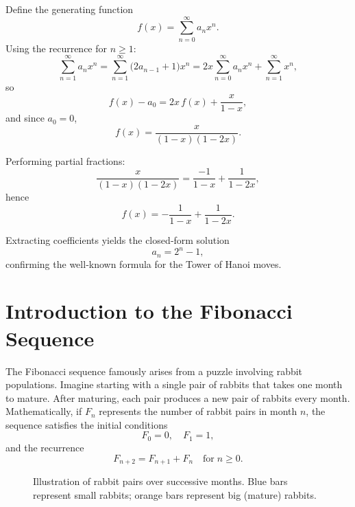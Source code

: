 \documentclass[docmute]{article}
\begin{document}
Define the generating function
\[
f(x) = \sum_{n=0}^\infty a_n x^n.
\]
Using the recurrence for \(n\ge1\):
\[
\sum_{n=1}^\infty a_n x^n 
= \sum_{n=1}^\infty \bigl(2a_{n-1}+1\bigr)x^n
= 2x\sum_{n=0}^\infty a_n x^n + \sum_{n=1}^\infty x^n,
\]
so
\[
f(x) - a_0 = 2x\,f(x) + \frac{x}{1-x},
\]
and since \(a_0=0\),
\[
f(x) = \frac{x}{(1-x)(1-2x)}.
\]

Performing partial fractions:
\[
\frac{x}{(1-x)(1-2x)}
= \frac{-1}{1-x} + \frac{1}{1-2x},
\]
hence
\[
f(x) = -\frac{1}{1-x} + \frac{1}{1-2x}.
\]

Extracting coefficients yields the closed‑form solution
\[
a_n = 2^n - 1,
\]
confirming the well‑known formula for the Tower of Hanoi moves.
\FloatBarrier

\section{Introduction to the Fibonacci Sequence}
The Fibonacci sequence famously arises from a puzzle involving rabbit populations.
Imagine starting with a single pair of rabbits that takes one month to mature.
After maturing, each pair produces a new pair of rabbits every month.
Mathematically, if \(F_n\) represents the number of rabbit pairs in month \(n\),
the sequence satisfies the initial conditions
\[
F_0 = 0, \quad F_1 = 1,
\]
and the recurrence
\[
F_{n+2} = F_{n+1} + F_n \quad \text{for} \; n \ge 0.
\]

\begin{figure}[ht]
  \centering
\caption{Illustration of rabbit pairs over successive months. 
Blue bars represent small rabbits; orange bars represent big (mature) rabbits.}
\end{figure}
\end{document}
